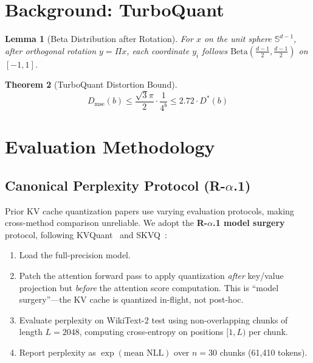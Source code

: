 \documentclass[10pt,twocolumn]{article}
\newtheorem{theorem}{Theorem}
\newtheorem{lemma}[theorem]{Lemma}
\begin{document}
\section{Background: TurboQuant}

\begin{lemma}[Beta Distribution after Rotation]
For $x$ on the unit sphere $\mathbb{S}^{d-1}$, after orthogonal rotation $y = \Pi x$, each coordinate $y_i$ follows $\text{Beta}(\frac{d-1}{2}, \frac{d-1}{2})$ on $[-1, 1]$.
\end{lemma}

\begin{theorem}[TurboQuant Distortion Bound]
\begin{equation}
D_{\text{mse}}(b) \leq \frac{\sqrt{3}\pi}{2} \cdot \frac{1}{4^b} \leq 2.72 \cdot D^*(b)
\end{equation}
\end{theorem}

\section{Evaluation Methodology}
\label{sec:methodology}

\subsection{Canonical Perplexity Protocol (R-$\alpha$.1)}

Prior KV cache quantization papers use varying evaluation protocols,
making cross-method comparison unreliable. We adopt the
\textbf{R-$\alpha$.1 model surgery} protocol, following
KVQuant~\citep{hooper2024kvquant} and SKVQ~\citep{duanmu2024skvq}:

\begin{enumerate}[nosep]
\item Load the full-precision model.
\item Patch the attention forward pass to apply quantization
      \emph{after} key/value projection but \emph{before} the
      attention score computation. This is ``model surgery''---the
      KV cache is quantized in-flight, not post-hoc.
\item Evaluate perplexity on WikiText-2 test using non-overlapping
      chunks of length $L{=}2048$, computing cross-entropy on
      positions $[1, L)$ per chunk.
\item Report perplexity as $\exp(\text{mean NLL})$ over $n{=}30$
      chunks (61,410 tokens).
\end{enumerate}
\end{document}
